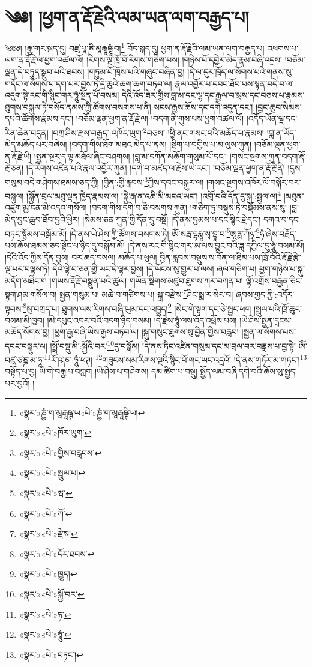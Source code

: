\chapter{༄༅། །ཕྱག་ན་རྡོ་རྗེའི་ལམ་ཡན་ལག་བརྒྱད་པ།}༄༅༅། །རྒྱ་གར་སྐད་དུ། བཛྲ་པཱ་ཎི་མཱརྒཱཥྚཱཾ་བ།\footnote{«སྣར་»ཎྱཾ་ག་མཱརྒཱཥྚ་ཡ«པེ་»ཎྱཾ་ག་མཱརྒཱཥྚི་ཡ།} བོད་སྐད་དུ། ཕྱག་ན་རྡོ་རྗེའི་ལམ་ཡན་ལག་བརྒྱད་པ། འཕགས་པ་ལག་ན་རྡོ་རྗེ་ལ་ཕྱག་འཚལ་ལོ། །རིགས་ལྔ་ཁྲོ་བོ་རིགས་གཅིག་པས། །གཉིས་པོ་དབྱེར་མེད་རྣམ་བཞི་འདྲས། །བཅོམ་ལྡན་དེ་བཏུད་སྒྲུབ་པའི་ཐབས། །གཏུམ་པོ་ཁྲོས་པའི་གཞུང་བཞིན་བྱ། །དེ་ལ་དུར་ཁྲོད་ལ་སོགས་པའི་གནས་སུ་གདོང་ལ་སོགས་པ་དག་པར་བྱས་ཏེ་དྲི་ཆུའི་ཆག་ཆག་བཏབ་ལ། རྣལ་འབྱོར་པ་དབང་ཐོབ་པས་སྟན་བདེ་བ་ལ་འདུག་སྟེ་རང་གི་སྙིང་གར་ཧཱུཾ་སྔོན་པོ་བསམ། དེའི་འོད་ཟེར་གྱིས་བླ་མ་དང་ལྷ་དང་རྒྱལ་བ་སྲས་དང་བཅས་པ་རྣམས་ཐུགས་བསྐུལ་ཏེ་བསོད་ནམས་ཀྱི་ཚོགས་བསགས་པ་ནི། སངས་རྒྱས་ཆོས་དང་དགེ་འདུན་དང་། །བྱང་ཆུབ་སེམས་དཔའི་ཚོགས་རྣམས་དང་། །བཅོམ་ལྡན་ཕྱག་ན་རྡོ་རྗེ་ལ། །བདག་ནི་གུས་པས་ཕྱག་འཚལ་ལོ། །འདོད་ཡོན་ལྔ་དང་རིན་ཆེན་བདུན། །བཀྲ་ཤིས་རྫས་བརྒྱད་:འཁོར་ཡུག་\footnote{«སྣར་»«པེ་»ཁོར་ཡུག་}བཅས། །ཕྱི་ནང་གསང་བའི་མཆོད་པ་རྣམས། །བླ་ན་ཡོད་མེད་མཆོད་པར་བཞེས། །བདག་གིས་ཐོག་མཐའ་མེད་པ་ནས། །སྡིག་པ་བགྱིས་པ་མ་ལུས་ཀུན། །བཅོམ་ལྡན་ཕྱག་ན་རྡོ་རྗེ་ཡི། །སྤྱན་སྔར་ད་ལྟ་མཐོལ་ཞིང་བཤགས། །བླ་མ་དཀོན་མཆོག་གསུམ་པོ་དང་། །གསང་སྔགས་ཀུན་བདག་རྡོ་རྗེ་ཅན། །དེ་རིགས་འཛིན་པའི་རྣལ་འབྱོར་ཀུན། །དགེ་བ་མཛད་ལ་རྗེས་ཡི་རང་། །བཅོམ་ལྡན་ཕྱག་ན་རྡོ་རྗེ་ནི། །དུས་གསུམ་བདེ་གཤེགས་ཐམས་ཅད་ཀྱི། །བྱིན་:གྱི་རླབས་\footnote{«སྣར་»«པེ་»གྱིས་བརླབས་}ཀྱིས་དབང་བསྐུར་ལ། །གསང་སྔགས་འཁོར་ལོ་བསྐོར་བར་བསྐུལ། །སྐྱོན་བྲལ་མཐུ་ལྡན་ཁྱེད་རྣམས་ལ། །སྐྱེ་རྒ་ན་འཆི་མི་མངའ་ཡང་། །འགྲོ་བའི་དོན་དུ་སྐུ་:སྤྲུལ་ལ།\footnote{«སྣར་»«པེ་»སྤྲུལ་པ།} །མཐུན་འཇུག་མྱ་ངན་མི་འདའ་གསོལ། །བདག་གིས་དགེ་བ་ཅི་བསགས་ཀུན། །གཅིག་ཏུ་བསྡུས་ཏེ་བསྡོམས་ནས་སུ། །བླ་མེད་བྱང་ཆུབ་ཐོབ་བྱའི་ཕྱིར། །སེམས་ཅན་ཀུན་གྱི་དོན་དུ་བསྔོ། །དེ་ནས་བྱམས་པ་དང་སྙིང་རྗེ་དང་། དགའ་བ་དང་བཏང་སྙོམས་བསྒོམ་མོ། །དེ་ནས་ཡེ་ཤེས་ཀྱི་ཚོགས་བསགས་ཏེ། ཨོཾ་སརྦ་དྷརྨཱ་སྭ་བྷཱ་བ་\footnote{«སྣར་»«པེ་»ཝ་}ཨཱཏྨ་ཀོ྅་\footnote{«སྣར་»«པེ་»ཀོ་}ཧཾ་ཞེས་བརྗོད་པས་ཆོས་ཐམས་ཅད་སྟོང་པ་ཉིད་དུ་བསྒོམ་མོ། །དེ་ནས་རང་གི་སྙིང་གར་ཨ་ལས་བྱུང་བའི་ཟླ་དཀྱིལ་དུ་ཧཱུཾ་བསམ་མོ། །དེའི་འོད་ཀྱིས་དོན་བྱས། བར་ཆད་བསལ། མཆོད་པ་ཕུལ། བྱིན་རླབས་བསྡུས་ས་བོན་ལ་ཐིམ་པས་ཁྲོ་བོའི་རྡོ་རྗེ་རྩེ་ལྔ་པར་བལྟས་ཏེ། དེའི་ལྟེ་བ་ཅན་གྱི་ཡང་དེ་ལྟར་བྱས། །དེ་ཡོངས་སུ་གྱུར་པ་ལས། ཞལ་གཅིག་པ། ཕྱག་གཉིས་པ་སྐུ་མདོག་མཐིང་ག །གཡས་རྡོ་རྗེ་བསྣུན་པའི་ཚུལ། གཡོན་སྡིགས་མཛུབ་ཐུགས་ཀར་བཀན་པ། ལྟོ་འགྲོས་བརྒྱན་ཅིང་སྟག་ཤམ་གསོལ་བ། སྤྱན་གསུམ་པ། མཆེ་བ་གཙིགས་པ། སྐྲ་བརྫེས་\footnote{«སྣར་»«པེ་»རྫེས་}ཤིང་སྨ་ར་སེར་བ། ཞབས་གྱད་ཀྱི་:འདོར་སྟབས་\footnote{«སྣར་»«པེ་»དོར་ཐབས་}སུ་བགྲད་པ། ཐུགས་ལས་རིགས་བཞི་ཡུམ་དང་འཁྱུད།\footnote{«སྣར་»«པེ་»ཁྱུད།} །སེང་གེ་སྟག་དང་ཅེ་སྤྱང་ཕག །སྤྲུལ་པའི་ཁྲོ་ཆུང་བསམ་མི་ཁྱབ། །མེ་དཔུང་འབར་བའི་བདག་ཉིད་བསམ། །དེ་རྗེས་ཧཱུཾ་ལས་འོད་འཕྲོས་པས། །ཡེ་ཤེས་སྤྱན་དྲངས་མཆོད་སོགས་བྱ། །ཕྱག་རྒྱ་བཞི་ཡིས་རྒྱས་བཏབ་ལ། །སྐུ་གསུང་ཐུགས་སུ་བྱིན་གྱིས་བརླབ། །སྤྱན་ལ་སོགས་པས་དབང་བསྐུར་ལ། །སྤྲོ་བསྡུ་མི་:སྐྱོའི་བར་\footnote{«སྣར་»«པེ་»སྐྱོ་བར་}དུ་བསྒོམ། །དེ་ནས་ཏིང་འཛིན་གསུམ་དང་མ་བྲལ་བར་བཟླས་པ་བྱ་སྟེ། ཨོཾ་བཛྲ་ཙཎྜ་མ་ཧཱ་\footnote{«སྣར་»«པེ་»ཧ་}རོ་ཥ་ཎ་:ཧཱུཾ་ཕཊ། \footnote{«སྣར་»«པེ་»ཧཱུཾ་}གཟུངས་སམ་རིགས་ལྔའི་སྙིང་པོ་གང་ཡང་འདྲའོ། །དེ་ནས་གཏོར་མ་གཏང་།\footnote{«སྣར་»«པེ་»བཏང་།} བསྟོད་པ་བྱ། ཡི་གེ་བརྒྱ་པ་བཀླག །ཡེ་ཤེས་པ་གཤེགས། དམ་ཚིག་པ་བསྡུ། སྤྱོད་ལམ་བཞི་དགེ་བའི་ཆོས་སུ་སྤྱད་པར་བྱའོ། །
